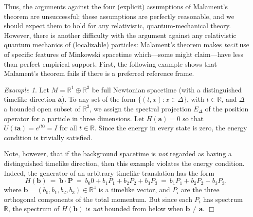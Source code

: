 \documentclass[12pt]{article}
\theoremstyle{remark}
\newtheorem{example}{Example}
\begin{document}
Thus, the arguments against the four (explicit) assumptions of
Malament's theorem are unsuccessful; these assumptions are perfectly
reasonable, and we should expect them to hold for any relativistic,
quantum-mechanical theory.  However, there is another difficulty with
the argument against any relativistic quantum mechanics of
(localizable) particles: Malament's theorem makes \emph{tacit} use of
specific features of Minkowski spacetime which---some might
claim---have less than perfect empirical support.  First, the
following example shows that Malament's theorem fails if there is a
preferred reference frame.

\begin{example} \label{aristotle} Let $M=\mathbb{R}^{1}\oplus
  \mathbb{R}^{3}$ be full Newtonian spacetime (with a distinguished
  timelike direction $\mathbf{a}$).  To any set of the form $\{
  (t,x):x\in \Delta \}$, with $t\in \mathbb{R}$, and $\Delta$ a
  bounded open subset of $\mathbb{R}^{3}$, we assign the spectral
  projection $E_{\Delta}$ of the position operator for a particle in
  three dimensions.  Let $H(\mathbf{a})=0$ so that
  $U(t\mathbf{a})=e^{it0}=I$ for all $t\in \mathbb{R}$.  Since the
  energy in every state is zero, the energy condition is trivially
  satisfied.
  
  Note, however, that if the background spacetime is \emph{not}
  regarded as having a distinguished timelike direction, then this
  example violates the energy condition.  Indeed, the generator of an
  arbitrary timelike translation has the form
\begin{equation}
H(\mathbf{b}) \:=\: \mathbf{b}\cdot \mathbf{P}\:=
\:b_{0}0+b_{1}P_{1}+b_{2}P_{2}+b_{3}P_{3}\:=\:b_{1}P_{1}+b_{2}P_{2}+b_{3}P_{3},
\end{equation} where
$\mathbf{b}=(b_{0},b_{1},b_{2},b_{3})\in \mathbb{R}^{4}$ is a timelike
vector, and $P_{i}$ are the three orthogonal components of the total
momentum.  But since each $P_{i}$ has spectrum $\mathbb{R}$, the
spectrum of $H(\mathbf{b})$ is \emph{not} bounded from below when
$\mathbf{b}\neq \mathbf{a}$.  \hfill $\Box$
\end{example}
\end{document}
